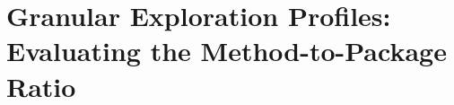
\section{Granular Exploration Profiles: Evaluating the Method-to-Package Ratio}
\label{sec:method_package_ratio_analysis}

